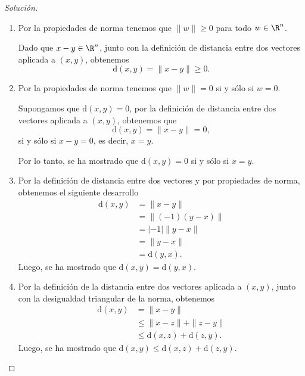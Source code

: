 \documentclass[a4,11pt]{aleph-notas}
\begin{document}
\begin{proof}[Solución]\hspace{0pt}
    \begin{enumerate}
        \item 
        Por la propiedades de norma tenemos que $\|w\|\geq0$ para todo $w\in\R^n$.
        
        Dado que $x-y\in\R^n$, junto con la definición de distancia entre dos vectores aplicada a $(x,y)$, obtenemos
        \[
            \text{d}(x,y) = \|x - y\| \geq 0.
        \]
        \item
        Por la propiedades de norma tenemos que $\|w\| = 0$ si y sólo si $w=0$.
        
        Supongamos que $\text{d}(x,y)=0$, por la definición de distancia entre dos vectores aplicada a $(x,y)$, obtenemos que 
        \[
            \text{d}(x,y) = \|x - y\| = 0,
        \]
        si y sólo si $x - y = 0$, es decir, $x=y$.
        
        Por lo tanto, se ha mostrado que $\text{d}(x,y) = 0$ si y sólo si $x=y$.
        \item
        Por la definición de distancia entre dos vectores y por propiedades de norma, obtenemos el siguiente desarrollo
        \begin{align*}
            \text{d}(x,y) &= \|x-y\|\\
                          &= \|(-1)(y-x)\|\\
                          &= |-1|\|y-x\|\\
                          &= \|y-x\|\\
                          &= \text{d}(y,x).
        \end{align*}
        Luego, se ha mostrado que $\text{d}(x,y) =\text{d}(y,x)$.
        \item 
        Por la definición de la distancia entre dos vectores aplicada a $(x,y)$, junto con la desigualdad triangular de la norma, obtenemos
        \begin{align*}
            \text{d}(x, y) &= \|x-y\|\\
                           &\leq \|x-z\| + \|z-y\|\\
                           &\leq \text{d}(x, z) + \text{d}(z,y).
        \end{align*}
        Luego, se ha mostrado que $\text{d}(x, y) \leq \text{d}(x, z) + \text{d}(z,y)$.
    \end{enumerate}
\end{proof}
    
\end{document}
